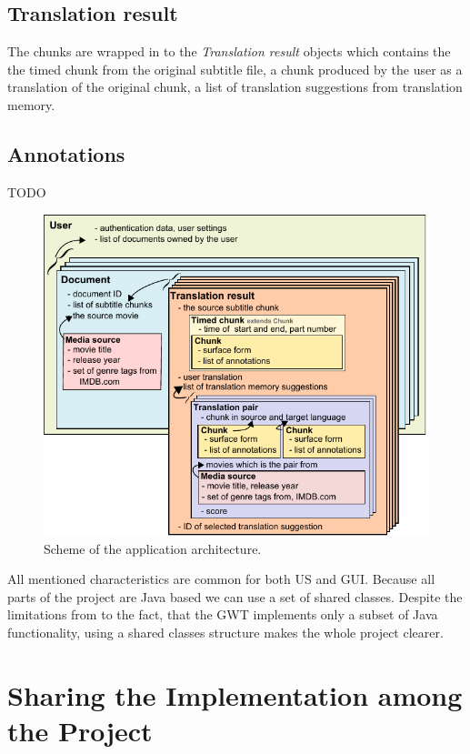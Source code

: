 \subsection*{Translation result}
The chunks are wrapped in to the \emph{Translation result} objects which contains the the timed chunk from the original subtitle file, a chunk produced by the user as a translation of the original chunk, a list of translation suggestions from translation memory.

\subsection*{Annotations}

TODO 

\begin{figure}[h]
\begin{center}
\includegraphics{figures/shared_classes.pdf}
\end{center}
\caption{Scheme of the application architecture.}\label{projectStructure:logical}
\end{figure}

All mentioned characteristics are common for both US and GUI. Because all parts of the project are Java based we can use a set of shared classes. Despite the limitations from to the fact, that the GWT implements only a subset of Java functionality, using a shared classes structure makes the whole project clearer. 


\section{Sharing the Implementation among the Project}

